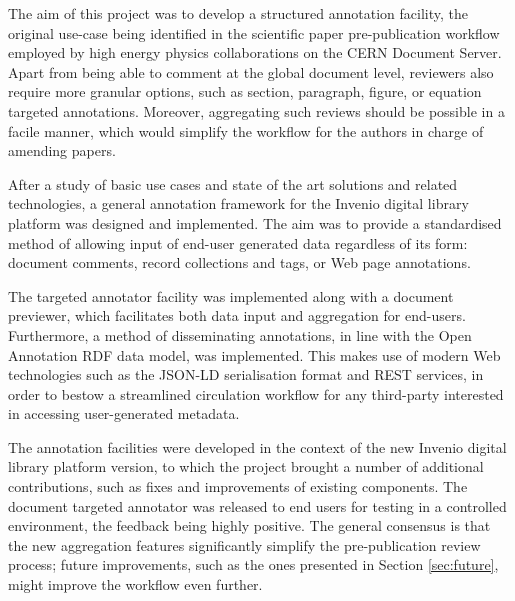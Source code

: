 
The aim of this project was to develop a structured annotation facility, the
original use-case being identified in the scientific paper pre-publication
workflow employed by high energy physics collaborations on the CERN Document
Server. Apart from being able to comment at the global document level,
reviewers also require more granular options, such as section, paragraph,
figure, or equation targeted annotations. Moreover, aggregating such
reviews should be possible in a facile manner, which would simplify the
workflow for the authors in charge of amending papers.

After a study of basic use cases and state of the art solutions and related
technologies, a general annotation framework for the Invenio digital library
platform was designed and implemented. The aim was to provide a standardised
method of allowing input of end-user generated data regardless of its form:
document comments, record collections and tags, or Web page annotations.

The targeted annotator facility was implemented along with a document
previewer, which facilitates both data input and aggregation for end-users.
Furthermore, a method of disseminating annotations, in line with the Open
Annotation RDF data model, was implemented. This makes use of modern Web
technologies such as the JSON-LD serialisation format and REST services, in
order to bestow a streamlined circulation workflow for any third-party
interested in accessing user-generated metadata.

The annotation facilities were developed in the context of the new Invenio
digital library platform version, to which the project brought a number of
additional contributions, such as fixes and improvements of existing
components.  The document targeted annotator was released to end users for
testing in a controlled environment, the feedback being highly positive. The
general consensus is that the new aggregation features significantly simplify
the pre-publication review process; future improvements, such as the ones
presented in Section \ref{sec:future}, might improve the workflow even further.
